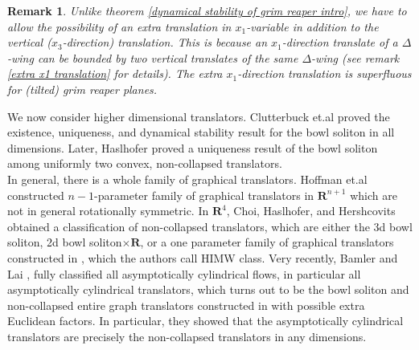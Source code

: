 \documentclass[pdflatex,sn-mathphys-num]{sn-jnl}%
\newtheorem{remark}[theorem]{Remark}
\begin{document}
\begin{remark}
    Unlike theorem \ref{dynamical stability of grim reaper intro}, we have to allow the possibility of an extra translation in $x_1$-variable in addition to the vertical ($x_3$-direction) translation. This is because an $x_1$-direction translate of a $\Delta$-wing can be bounded by two vertical translates of the same $\Delta$-wing (see remark \ref{extra x1 translation} for details). The extra $x_1$-direction translation is superfluous for (tilted) grim reaper planes. 
\end{remark}

We now consider higher dimensional translators. Clutterbuck et.al \cite{bowlstability} proved the existence, uniqueness, and dynamical stability result for the bowl soliton in all dimensions. Later, Haslhofer \cite{Haslhofer2014UniquenessOT} proved a uniqueness result of the bowl soliton among uniformly two convex, non-collapsed translators. \\

In general, there is a whole family of graphical translators. Hoffman et.al \cite{Hoffman2018GraphicalTF} constructed $n-1$-parameter family of graphical translators in $\mathbf{R}^{n+1}$ which are not in general rotationally symmetric. In $\mathbf{R}^4$, Choi, Haslhofer, and Hershcovits \cite{Choi2021ClassificationON} obtained a classification of non-collapsed translators, which are either the 3d bowl soliton, 2d bowl soliton$\times \mathbf{R}$, or a one parameter family of graphical translators constructed in \cite{Hoffman2018GraphicalTF}, which the authors call HIMW class. Very recently, Bamler and Lai \cite{Bamler2025-thclassification}, \cite{Bamler2025-pdeodi} fully classified all asymptotically cylindrical flows, in particular all asymptotically cylindrical translators, which turns out to be the bowl soliton and non-collapsed entire graph translators constructed in \cite{Hoffman2018GraphicalTF} with possible extra Euclidean factors. In particular, they showed that the asymptotically cylindrical translators are precisely the non-collapsed translators in any dimensions.\\
\end{document}
